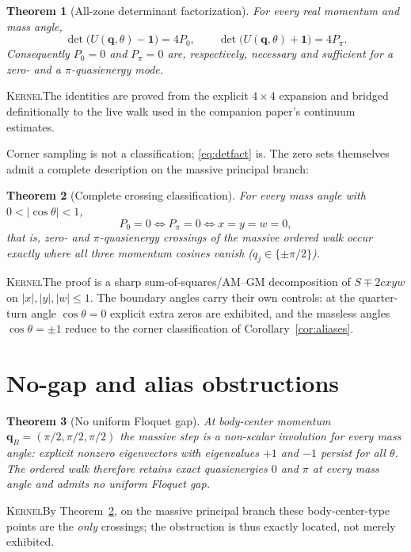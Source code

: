 \documentclass[11pt]{article}
\newcommand{\id}{\mathbf{1}}
\newcommand{\Kernel}{\textcolor{kernelcolor}{\textsc{Kernel}}}
\newtheorem{theorem}{Theorem}
\begin{document}
\begin{theorem}[All-zone determinant factorization]\label{thm:det}
For every real momentum and mass angle,
\begin{equation}\label{eq:detfact}
 \det\!\bigl(U(\mathbf q,\theta)-\id\bigr)=4P_0,
 \qquad
 \det\!\bigl(U(\mathbf q,\theta)+\id\bigr)=4P_\pi .
\end{equation}
Consequently $P_0=0$ and $P_\pi=0$ are, respectively, necessary and
sufficient for a zero- and a $\pi$-quasienergy mode.
\end{theorem}
\noindent\Kernel{}\quad The identities are proved from the explicit
$4\times4$ expansion and bridged definitionally to the live walk used in
the companion paper's continuum estimates.

Corner sampling is not a classification; \eqref{eq:detfact} is.  The zero
sets themselves admit a complete description on the massive principal
branch:

\begin{theorem}[Complete crossing classification]\label{thm:class}
For every mass angle with $0<|\cos\theta|<1$,
\begin{equation}
 P_0=0
 \iff
 P_\pi=0
 \iff
 x=y=w=0,
\end{equation}
that is, zero- and $\pi$-quasienergy crossings of the massive ordered walk
occur exactly where all three momentum cosines vanish
($q_j\in\{\pm\pi/2\}$).
\end{theorem}
\noindent\Kernel{}\quad The proof is a sharp sum-of-squares/AM--GM
decomposition of $S\mp2cxyw$ on $|x|,|y|,|w|\le1$.  The boundary angles
carry their own controls: at the quarter-turn angle $\cos\theta=0$
explicit extra zeros are exhibited, and the massless angles
$\cos\theta=\pm1$ reduce to the corner classification of
Corollary~\ref{cor:aliases}.

\section{No-gap and alias obstructions}
\label{sec:obstructions}

\begin{theorem}[No uniform Floquet gap]\label{thm:bodycenter}
At body-center momentum $\mathbf q_B=(\pi/2,\pi/2,\pi/2)$ the massive step
is a non-scalar involution for every mass angle: explicit nonzero
eigenvectors with eigenvalues $+1$ and $-1$ persist for all $\theta$.  The
ordered walk therefore retains exact quasienergies $0$ and $\pi$ at every
mass angle and admits no uniform Floquet gap.
\end{theorem}
\noindent\Kernel{}\quad By Theorem~\ref{thm:class}, on the massive
principal branch these body-center-type points are the \emph{only}
crossings; the obstruction is thus exactly located, not merely exhibited.
\end{document}
